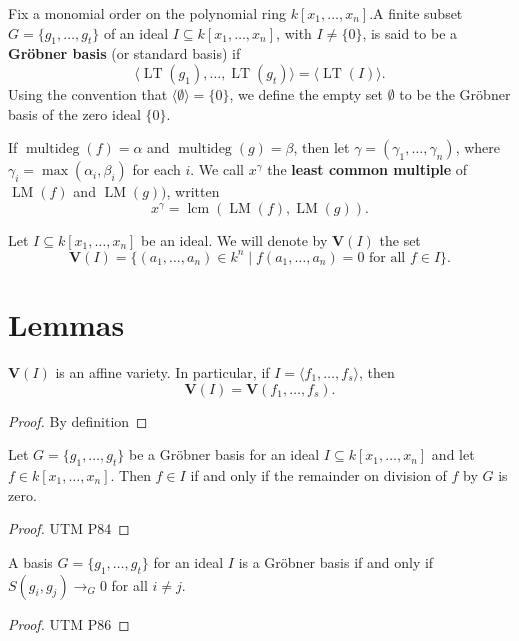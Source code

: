 \begin{definition}\label{Gröbner Basis}
  \leanok
  Fix a monomial order on the polynomial ring $k[x_1, \ldots, x_n]$.A finite subset $G = \{g_1, \ldots, g_t\}$ of an ideal $I \subseteq k[x_1, \ldots, x_n]$, with $I \ne \{0\}$, is said to be a \textbf{Gröbner basis} (or standard basis) if
  \[
  \langle \operatorname{LT}(g_1), \ldots, \operatorname{LT}(g_t) \rangle = \langle \operatorname{LT}(I) \rangle.
  \]
  Using the convention that $\langle \emptyset \rangle = \{0\}$, we define the empty set $\emptyset$ to be the Gröbner basis of the zero ideal $\{0\}$.
\end{definition}

\begin{definition}\label{LCM}
  If $\operatorname{multideg}(f) = \alpha$ and $\operatorname{multideg}(g) = \beta$, then let $\gamma = (\gamma_1, \ldots, \gamma_n)$, where $\gamma_i = \max(\alpha_i, \beta_i)$ for each $i$. We call $x^\gamma$ the \textbf{least common multiple} of $\operatorname{LM}(f)$ and $\operatorname{LM}(g))$, written
  \[
  x^\gamma = \operatorname{lcm}(\operatorname{LM}(f), \operatorname{LM}(g)).
  \]
\end{definition}

\begin{definition}\label{S Polynomial}

\end{definition}

\begin{definition}\label{Variety}
  Let \( I \subseteq k[x_1, \ldots, x_n] \) be an ideal. We will denote by \( \mathbf{V}(I) \) the set
  \[
  \mathbf{V}(I) = \{(a_1, \ldots, a_n) \in k^n \mid f(a_1, \ldots, a_n) = 0 \text{ for all } f \in I\}.
  \]
\end{definition}


\chapter{Lemmas}
\begin{lemma}\label{f_generate_variety}
  \( \mathbf{V}(I) \) is an affine variety. In particular, if \( I = \langle f_1, \ldots, f_s \rangle \), then
  \[
  \mathbf{V}(I) = \mathbf{V}(f_1, \ldots, f_s).
  \]
\end{lemma}
\begin{proof}
  By definition
\end{proof}

\begin{lemma}\label{groebner_membership}
  Let \( G = \{g_1, \dots, g_t\} \) be a Gröbner basis for an ideal \( I \subseteq k[x_1, \dots, x_n] \) and let \( f \in k[x_1, \dots, x_n] \). Then \( f \in I \) if and only if the remainder on division of \( f \) by \( G \) is zero.
\end{lemma}
\begin{proof}
  UTM P84
\end{proof}

\begin{lemma}\label{Buchberger Criteria}
A basis \( G = \{ g_1, \ldots, g_t \} \) for an ideal \( I \) is a Gröbner basis if and only if \( S(g_i, g_j) \to_G 0 \) for all \( i \neq j \).
\end{lemma}
\begin{proof}
 UTM P86
\end{proof}
